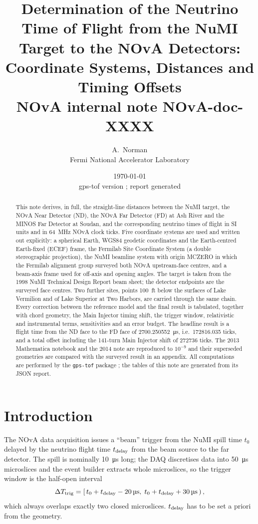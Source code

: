 \documentclass[11pt,letterpaper]{article}
\title{\bfseries Determination of the Neutrino Time of Flight from the NuMI Target to the NOvA Detectors:\\[3pt] Coordinate Systems, Distances and Timing Offsets\\[6pt] \normalsize NOvA internal note NOvA-doc-XXXX}
\author{A.~Norman\\ \small Fermi National Accelerator Laboratory}
\date{\today\\ \small gps-tof version \gpstofversion; report generated \reportgenerated}
\newcommand{\ND}{ND}
\newcommand{\FD}{FD}
\newcommand{\code}[1]{\texttt{#1}}
\begin{document}
\maketitle

\begin{abstract}
This note derives, in full, the straight-line distances between the NuMI target, the NOvA Near Detector (\ND), the NOvA Far Detector (\FD) at Ash River and the MINOS Far Detector at Soudan, and the corresponding neutrino times of flight in SI units and in \SI{64}{MHz} NOvA clock ticks.  Five coordinate systems are used and written out explicitly: a spherical Earth, WGS84 geodetic coordinates and the Earth-centred Earth-fixed (ECEF) frame, the Fermilab Site Coordinate System (a double stereographic projection), the NuMI beamline system with origin MCZERO in which the Fermilab alignment group surveyed both NOvA upstream-face centres, and a beam-axis frame used for off-axis and opening angles.  The target is taken from the 1998 NuMI Technical Design Report beam sheet; the detector endpoints are the surveyed face centres.  Two further sites, points \SI{100}{ft} below the surfaces of Lake Vermilion and of Lake Superior at Two Harbors, are carried through the same chain.  Every correction between the reference model and the final result is tabulated, together with chord geometry, the Main Injector timing shift, the trigger window, relativistic and instrumental terms, sensitivities and an error budget.  The headline result is a flight time from the \ND{} face to the \FD{} face of \SI{2700.250552}{\micro s}, i.e.\ \num{172816.035} ticks, and a total offset including the 141-turn Main Injector shift of \num{272736} ticks.  The 2013 Mathematica notebook and the 2014 note \cite{norman2014} are reproduced to $10^{-9}$ and their superseded geometries are compared with the surveyed result in an appendix.  All computations are performed by the \code{gps-tof} package \cite{gpstof}; the tables of this note are generated from its JSON report.
\end{abstract}

\tableofcontents

\section{Introduction}
The NOvA data acquisition issues a ``beam'' trigger from the NuMI spill time $t_0$ delayed by the neutrino flight time $t_{\rm delay}$ from the beam source to the far detector.  The spill is nominally \SI{10}{\micro s} long; the DAQ discretises data into \SI{50}{\micro s} microslices and the event builder extracts whole microslices, so the trigger window is the half-open interval \cite{norman2014}
\begin{equation}
\Delta T_{\rm trig} = \left[\, t_0 + t_{\rm delay} - \SI{20}{\micro s},\; t_0 + t_{\rm delay} + \SI{30}{\micro s}\,\right),
\label{eq:window}
\end{equation}
which always overlaps exactly two closed microslices.  $t_{\rm delay}$ has to be set a priori from the geometry.
\end{document}
